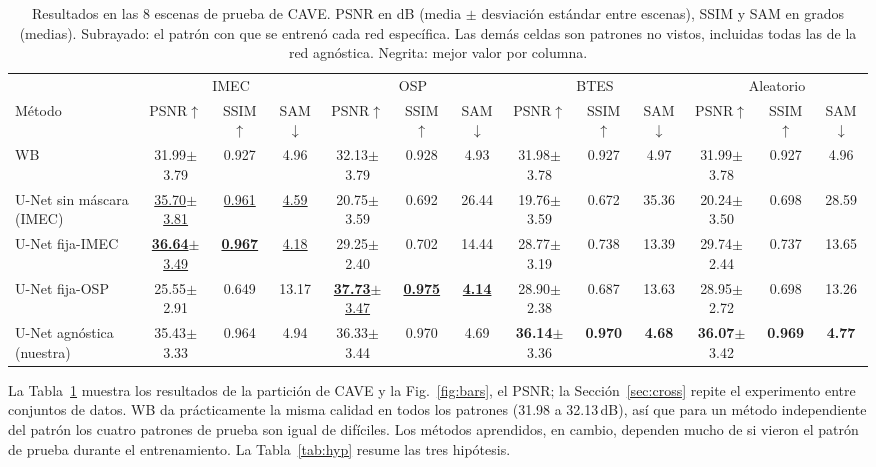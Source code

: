 \documentclass{article}
\newcommand{\seen}[1]{\underline{#1}}
\begin{document}
\begin{table}[t]
\centering
\caption{Resultados en las 8 escenas de prueba de CAVE. PSNR en dB (media
$\pm$ desviación estándar entre escenas), SSIM y SAM en grados (medias).
Subrayado: el patrón con que se entrenó cada red específica. Las demás
celdas son patrones no vistos, incluidas todas las de la red agnóstica.
Negrita: mejor valor por columna.}
\label{tab:main}
\footnotesize
\setlength{\tabcolsep}{2.2pt}
\begin{tabular}{|l|ccc|ccc|ccc|ccc|}
\hline
& \multicolumn{3}{c|}{IMEC} & \multicolumn{3}{c|}{OSP}
& \multicolumn{3}{c|}{BTES} & \multicolumn{3}{c|}{Aleatorio} \\
Método & PSNR$\uparrow$ & SSIM$\uparrow$ & SAM$\downarrow$
       & PSNR$\uparrow$ & SSIM$\uparrow$ & SAM$\downarrow$
       & PSNR$\uparrow$ & SSIM$\uparrow$ & SAM$\downarrow$
       & PSNR$\uparrow$ & SSIM$\uparrow$ & SAM$\downarrow$ \\
\hline
WB~\cite{brauers2006}
  & 31.99$\pm$3.79 & 0.927 & 4.96
  & 32.13$\pm$3.79 & 0.928 & 4.93
  & 31.98$\pm$3.78 & 0.927 & 4.97
  & 31.99$\pm$3.78 & 0.927 & 4.96 \\
U-Net sin máscara (IMEC)
  & \seen{35.70$\pm$3.81} & \seen{0.961} & \seen{4.59}
  & 20.75$\pm$3.59 & 0.692 & 26.44
  & 19.76$\pm$3.59 & 0.672 & 35.36
  & 20.24$\pm$3.50 & 0.698 & 28.59 \\
U-Net fija-IMEC
  & \seen{\textbf{36.64}$\pm$3.49} & \seen{\textbf{0.967}} & \seen{4.18}
  & 29.25$\pm$2.40 & 0.702 & 14.44
  & 28.77$\pm$3.19 & 0.738 & 13.39
  & 29.74$\pm$2.44 & 0.737 & 13.65 \\
U-Net fija-OSP
  & 25.55$\pm$2.91 & 0.649 & 13.17
  & \seen{\textbf{37.73}$\pm$3.47} & \seen{\textbf{0.975}} & \seen{\textbf{4.14}}
  & 28.90$\pm$2.38 & 0.687 & 13.63
  & 28.95$\pm$2.72 & 0.698 & 13.26 \\
U-Net agnóstica (nuestra)
  & 35.43$\pm$3.33 & 0.964 & 4.94
  & 36.33$\pm$3.44 & 0.970 & 4.69
  & \textbf{36.14}$\pm$3.36 & \textbf{0.970} & \textbf{4.68}
  & \textbf{36.07}$\pm$3.42 & \textbf{0.969} & \textbf{4.77} \\
\hline
\end{tabular}
\end{table}

La Tabla~\ref{tab:main} muestra los resultados de la partición de CAVE y la
Fig.~\ref{fig:bars}, el PSNR; la Sección~\ref{sec:cross} repite el
experimento entre conjuntos de datos. WB da prácticamente la misma calidad
en todos los patrones (31.98 a 32.13\,dB), así que para un método
independiente del patrón los cuatro patrones de prueba son igual de
difíciles. Los métodos aprendidos, en cambio, dependen mucho de si vieron el
patrón de prueba durante el entrenamiento. La Tabla~\ref{tab:hyp} resume las
tres hipótesis.
\end{document}
